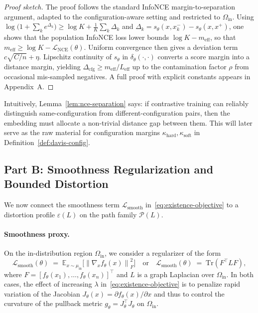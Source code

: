 \documentclass[11pt]{article}
\newcommand{\E}{\mathbb{E}}
\newcommand{\norm}[1]{\left\lVert #1 \right\rVert}
\begin{document}
\begin{proof}[Proof sketch]
The proof follows the standard InfoNCE margin-to-separation argument, adapted to the
configuration-aware setting and restricted to $\Omega_{\mathrm{in}}$. Using
$\log\bigl(1 + \sum_k e^{\Delta_k}\bigr) \ge \log K + \tfrac{1}{K}\sum_k \Delta_k$ and
$\Delta_k = s_\theta(x,x^-_k) - s_\theta(x,x^+)$, one shows that the population InfoNCE loss lower
bounds $\log K - m_{\mathrm{eff}}$, so that
$m_{\mathrm{eff}} \ge \log K - \mathcal{L}_{\mathrm{NCE}}(\theta)$. Uniform convergence then gives
a deviation term $c\sqrt{C/n} + \eta$. Lipschitz continuity of $s_\theta$ in
$\delta_\theta(\cdot,\cdot)$ converts a score margin into a distance margin, yielding
$\Delta_{\mathrm{cfg}} \ge m_{\mathrm{eff}} / L_{\mathrm{eff}}$ up to the contamination factor $\rho$
from occasional mis-sampled negatives. A full proof with explicit constants appears in Appendix~A.
\end{proof}

Intuitively, Lemma~\ref{lem:nce-separation} says: if contrastive training can reliably distinguish
same-configuration from different-configuration pairs, then the embedding must allocate a
non-trivial distance gap between them. This will later serve as the raw material for configuration
margins $\kappa_{\mathrm{hard}},\kappa_{\mathrm{soft}}$ in Definition~\ref{def:davis-config}.

\subsection{Part B: Smoothness Regularization and Bounded Distortion}
\label{subsec:existence-smoothness}

We now connect the smoothness term $\mathcal{L}_{\mathrm{smooth}}$ in~\eqref{eq:existence-objective}
to a distortion profile $\varepsilon(L)$ on the path family $\mathcal{P}(L)$.

\paragraph{Smoothness proxy.}
On the in-distribution region $\Omega_{\mathrm{in}}$, we consider a regularizer of the form
\begin{equation}
\label{eq:lsmooth}
\mathcal{L}_{\mathrm{smooth}}(\theta)
\;=\;
\E_{x \sim \mu_{\mathrm{in}}}
\bigl[ \norm{\nabla_x f_\theta(x)}_F^2 \bigr]
\quad\text{or}\quad
\mathcal{L}_{\mathrm{smooth}}(\theta)
\;=\;
\mathrm{Tr}(F^\top L F),
\end{equation}
where $F = [f_\theta(x_1),\dots,f_\theta(x_n)]^\top$ and $L$ is a graph Laplacian over
$\Omega_{\mathrm{in}}$. In both cases, the effect of increasing $\lambda$ in~\eqref{eq:existence-objective}
is to penalize rapid variation of the Jacobian $J_\theta(x) = \partial f_\theta(x) / \partial x$ and
thus to control the curvature of the pullback metric $g_\theta = J_\theta^\top J_\theta$ on
$\Omega_{\mathrm{in}}$.
\end{document}
